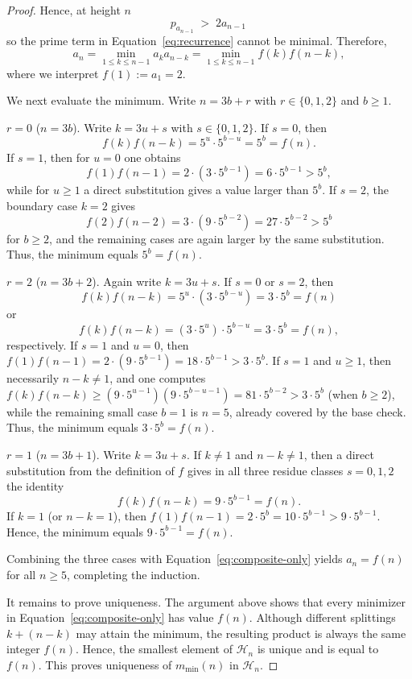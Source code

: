 \documentclass[11pt]{article}
\theoremstyle{definition}
\begin{document}
\begin{proof}
Hence, at height $n$
\[
  p_{a_{n-1}} \;>\;2a_{n-1}\,
\]
so the prime term in Equation~\eqref{eq:recurrence} cannot be minimal. Therefore,
\begin{equation}\label{eq:composite-only}
  a_n=\min_{1\le k\le n-1} a_k a_{n-k}
      =\min_{1\le k\le n-1} f(k)f(n-k),
\end{equation}
where we interpret $f(1):=a_1=2$.

We next evaluate the minimum.  Write $n=3b+r$ with $r\in\{0,1,2\}$ and $b\ge 1$.

\vskip 5pt $r=0$ ($n=3b$).
Write $k=3u+s$ with $s\in\{0,1,2\}$.  If $s=0$, then
\[
  f(k)f(n-k)=5^u\cdot 5^{b-u}=5^b=f(n).
\]
If $s=1$, then for $u=0$ one obtains
\[
  f(1)f(n-1)=2\cdot(3\cdot5^{b-1})=6\cdot5^{b-1}>5^b,
\]
while for $u\ge1$ a direct substitution gives a value larger than $5^b$.
If $s=2$, the boundary case $k=2$ gives
\[
  f(2)f(n-2)=3\cdot(9\cdot5^{b-2})=27\cdot5^{b-2}>5^b
\]
for $b\ge2$, and the remaining cases are again larger by the same substitution.
Thus, the minimum equals $5^b=f(n)$.

\vskip 5pt $r=2$ ($n=3b+2$).
Again write $k=3u+s$. If $s=0$ or $s=2$, then
\[
  f(k)f(n-k)=5^u\cdot (3\cdot 5^{b-u})=3\cdot 5^b=f(n)
\]
or
\[
  f(k)f(n-k)=(3\cdot 5^{u})\cdot 5^{b-u}=3\cdot 5^b=f(n),
\]
respectively.
If $s=1$ and $u=0$, then $f(1)f(n-1)=2\cdot (9\cdot 5^{b-1})=18\cdot 5^{b-1}>\!3\cdot 5^b$.
If $s=1$ and $u\ge 1$, then necessarily $n-k\neq 1$, and one computes
$f(k)f(n-k)\ge (9\cdot 5^{u-1})(9\cdot 5^{b-u-1})=81\cdot 5^{b-2}>\!3\cdot 5^b$ (when $b\ge 2$),
while the remaining small case $b=1$ is $n=5$, already covered by the base check.
Thus, the minimum equals $3\cdot 5^b=f(n)$.

\vskip 5pt $r=1$ ($n=3b+1$).
Write $k=3u+s$.  If $k\neq 1$ and $n-k\neq 1$, then a direct substitution from the
definition of $f$ gives in all three residue classes $s=0,1,2$ the identity
\[
  f(k)f(n-k)=9\cdot 5^{b-1}=f(n).
\]
If $k=1$ (or $n-k=1$), then $f(1)f(n-1)=2\cdot 5^b=10\cdot 5^{b-1}>\!9\cdot 5^{b-1}$.
Hence, the minimum equals $9\cdot 5^{b-1}=f(n)$.

\smallskip
Combining the three cases with Equation~\eqref{eq:composite-only} yields $a_n=f(n)$ for all $n\ge 5$,
completing the induction.

It remains to prove uniqueness.  The argument above shows that every minimizer in Equation~\eqref{eq:composite-only}
has value $f(n)$.  Although different splittings $k+(n-k)$ may attain the
minimum, the resulting product is always the same integer $f(n)$.  Hence, the
smallest element of $\mathcal H_n$ is unique and is equal to $f(n)$.
This proves uniqueness of $m_{\min}(n)$ in $\mathcal H_n$.
\end{proof}
\end{document}
